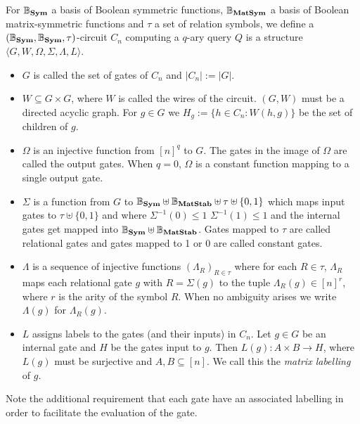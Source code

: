 \documentclass[../paper.tex]{subfiles}
\begin{document}
\begin{definition}
  For $\mathbb{B}_{\text{\textbf{Sym}}}$ a basis of Boolean symmetric functions,
  $\mathbb{B}_{\text{\textbf{MatSym}}}$ a basis of Boolean matrix-symmetric functions and
  $\tau$ a set of relation symbols, we define a $(\mathbb{B}_{\text{\textbf{Sym}}},
  \mathbb{B}_{\text{\textbf{Sym}}}, \tau)$-circuit $C_n$ computing a $q$-ary query $Q$ is a
  structure $\langle G, W, \Omega, \Sigma, \Lambda, L\rangle$.
  \begin{itemize}
    \setlength\itemsep{0mm}
  \item $G$ is called the set of gates of $C_n$ and $\vert C_n \vert := \vert G
    \vert$.
  \item $W \subseteq G \times G$, where $W$ is called the wires of the circuit.
    $(G,W)$ must be a directed acyclic graph. For $g \in G$ we $H_g := \{ h \in
    C_n : W(h,g)\}$ be the set of children of $g$.
  \item $\Omega$ is an injective function from $[n]^q$ to $G$. The gates in the
    image of $\Omega$ are called the output gates. When $q = 0$, $\Omega$ is a
    constant function mapping to a single output gate.
  \item $\Sigma$ is a function from $G$ to $\mathbb{B}_{\text{\textbf{Sym}}} \uplus
    \mathbb{B}_{\text{\textbf{MatStab}}} \uplus \tau \uplus \{0,1\} $ which maps input gates to
    $\tau \uplus \{0,1\}$ and where $\Sigma^{-1} (0) \leq 1$ $\Sigma^{-1} (1)
    \leq 1$ and the internal gates get mapped into $\mathbb{B}_{\text{\textbf{Sym}}} \uplus
    \mathbb{B}_{\text{\textbf{MatStab}}}$. Gates mapped to $\tau$ are called relational gates and
    gates mapped to 1 or 0 are called constant gates.
  \item $\Lambda$ is a sequence of injective functions $(\Lambda_R)_{R \in
      \tau}$ where for each $R \in \tau$, $\Lambda_R$ maps each relational gate
    $g$ with $R = \Sigma (g)$ to the tuple $\Lambda_R (g) \in [n]^r$, where $r$
    is the arity of the symbol $R$. When no ambiguity arises we write $\Lambda
    (g)$ for $\Lambda_R (g)$.
  \item $L$ assigns labels to the gates (and their inputs) in $C_n$. Let $g \in
    G$ be an internal gate and $H$ be the gates input to $g$. Then $L(g) : A
    \times B \rightarrow H$, where $L(g)$ must be surjective and $A, B \subseteq
    [n]$. We call this the \emph{matrix labelling} of $g$.
  \end{itemize}
\end{definition}

Note the additional requirement that each gate have an associated labelling in
order to facilitate the evaluation of the gate.
\end{document}
